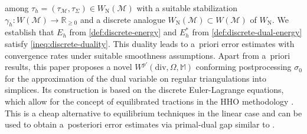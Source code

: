 \documentclass[a4paper]{amsart}
\numberwithin{equation}{section}
\renewcommand{\div}{\mathrm{div}}
\newcommand{\Mcal}{\mathcal{M}}
\newcommand{\M}{\mathbb{M}}
\theoremstyle{remark}
\begin{document}
among $\tau_h = (\tau_\mathcal{M},\tau_\Sigma) \in W_\mathrm{N}(\mathcal{M})$
with a suitable stabilization $\gamma_h : W(\mathcal{M}) \to \mathbb{R}_{\geq 0}$ and a discrete analogue $W_\mathrm{N}(\mathcal{M}) \subset W(\Mcal)$ of $W_\mathrm{N}$.
We establish that $E_h$ from \eqref{def:discrete-energy} and $E_h^*$ from \eqref{def:discrete-dual-energy} satisfy \eqref{ineq:discrete-duality}.
This duality leads to a~priori error estimates with convergence rates under suitable smoothness assumptions.
Apart from a~priori results, this paper proposes a novel $W^{p'}(\div,\Omega,\M)$ conforming postprocessing $\sigma_0$ for the approximation of the dual variable on regular triangulations into simplices. 
Its construction is based on the discrete Euler-Lagrange equations, which allow for the concept of equilibrated tractions in the HHO methodology \cite{DiPietroDroniou2017,AbbasErnPignet2018}.
This is a cheap alternative to equilibrium techniques \cite{BraessSchoeberl2008,ErnVohralik2015,ErnVohralik2020} in the linear case and
can be used to obtain a~posteriori error estimates via primal-dual gap similar to \cite{Repin2000,Bartels2015,CarstensenLiu2015,CarstensenTran2021,BartelsKaltenbach2023}.
\end{document}
